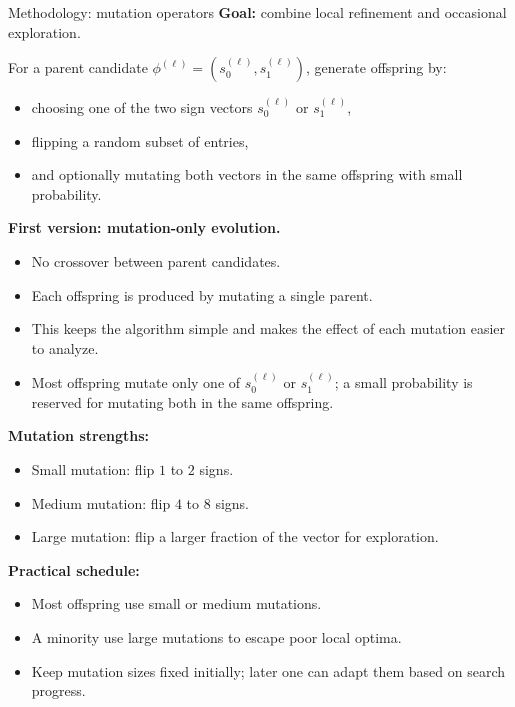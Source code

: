 \documentclass[aspectratio=169,11pt]{beamer}
\begin{document}
\begin{frame}{Methodology: mutation operators}
\textbf{Goal:} combine local refinement and occasional exploration.

\vspace{0.2cm}
For a parent candidate $\phi^{(\ell)} = (s_0^{(\ell)}, s_1^{(\ell)})$, generate offspring by:
\begin{itemize}
  \item choosing one of the two sign vectors $s_0^{(\ell)}$ or $s_1^{(\ell)}$,
  \item flipping a random subset of entries,
  \item and optionally mutating both vectors in the same offspring with small probability.
\end{itemize}

\vspace{0.2cm}
\textbf{First version: mutation-only evolution.}
\begin{itemize}
  \item No crossover between parent candidates.
  \item Each offspring is produced by mutating a single parent.
  \item This keeps the algorithm simple and makes the effect of each mutation easier to analyze.
  \item Most offspring mutate only one of $s_0^{(\ell)}$ or $s_1^{(\ell)}$; a small probability is reserved for mutating both in the same offspring.
\end{itemize}

\vspace{0.2cm}
\textbf{Mutation strengths:}
\begin{itemize}
  \item Small mutation: flip $1$ to $2$ signs.
  \item Medium mutation: flip $4$ to $8$ signs.
  \item Large mutation: flip a larger fraction of the vector for exploration.
\end{itemize}

\vspace{0.2cm}
\textbf{Practical schedule:}
\begin{itemize}
  \item Most offspring use small or medium mutations.
  \item A minority use large mutations to escape poor local optima.
  \item Keep mutation sizes fixed initially; later one can adapt them based on search progress.
\end{itemize}
\end{frame}
\end{document}

